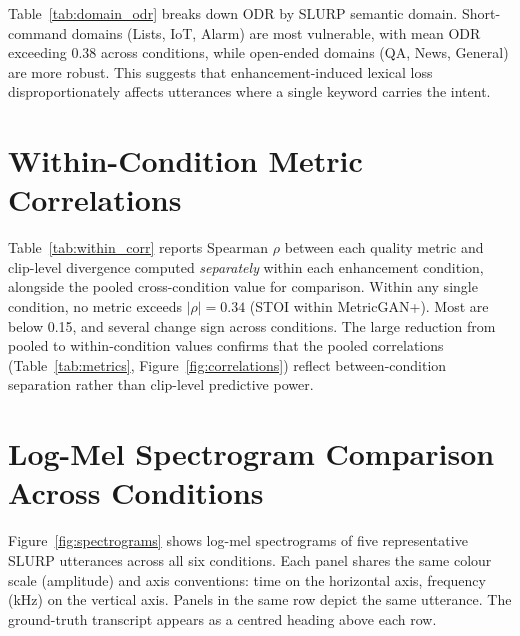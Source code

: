 \documentclass[11pt]{article}
\begin{document}
Table~\ref{tab:domain_odr} breaks down ODR by SLURP
semantic domain. Short-command domains (Lists, IoT, Alarm)
are most vulnerable, with mean ODR exceeding 0.38 across
conditions, while open-ended domains (QA, News, General)
are more robust. This suggests that enhancement-induced
lexical loss disproportionately affects utterances where a
single keyword carries the intent.


\section{Within-Condition Metric Correlations}
\label{app:within_corr}



Table~\ref{tab:within_corr} reports Spearman $\rho$ between each
quality metric and clip-level divergence computed \emph{separately}
within each enhancement condition, alongside the pooled cross-condition
value for comparison.
Within any single condition, no metric exceeds $|\rho| = 0.34$
(STOI within MetricGAN{+}). Most are below 0.15, and several change
sign across conditions.
The large reduction from pooled to within-condition values confirms
that the pooled correlations (Table~\ref{tab:metrics},
Figure~\ref{fig:correlations}) reflect between-condition separation
rather than clip-level predictive power.

\section{Log-Mel Spectrogram Comparison Across Conditions}
\label{app:spectrograms}

Figure~\ref{fig:spectrograms} shows log-mel spectrograms of five
representative SLURP utterances across all six conditions.
Each panel shares the same colour scale (amplitude) and axis
conventions: time on the horizontal axis, frequency (kHz) on the
vertical axis.
Panels in the same row depict the same utterance. The ground-truth
transcript appears as a centred heading above each row.


\newlength{\specw}
\setlength{\specw}{2.2cm}



\vspace*{\fill}
\end{document}
